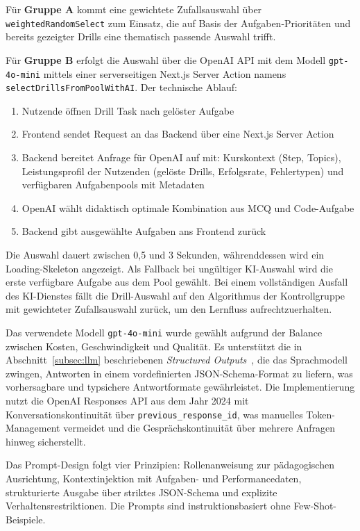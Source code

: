 Für \textbf{Gruppe A} kommt eine gewichtete Zufallsauswahl über \texttt{weightedRandomSelect} zum Einsatz, die auf Basis der Aufgaben-Prioritäten und bereits gezeigter Drills eine thematisch passende Auswahl trifft.

Für \textbf{Gruppe B} erfolgt die Auswahl über die OpenAI API mit dem Modell \texttt{gpt-4o-mini} mittels einer serverseitigen Next.js Server Action namens \texttt{selectDrillsFromPoolWithAI}.
Der technische Ablauf:
\begin{enumerate}
    \item Nutzende öffnen Drill Task nach gelöster Aufgabe
    \item Frontend sendet Request an das Backend über eine Next.js Server Action
    \item Backend bereitet Anfrage für OpenAI auf mit: Kurskontext (Step, Topics), Leistungsprofil der Nutzenden (gelöste Drills, Erfolgsrate, Fehlertypen) und verfügbaren Aufgabenpools mit Metadaten
    \item OpenAI wählt didaktisch optimale Kombination aus MCQ und Code-Aufgabe
    \item Backend gibt ausgewählte Aufgaben ans Frontend zurück
\end{enumerate}
Die Auswahl dauert zwischen 0,5 und 3 Sekunden, währenddessen wird ein Loading-Skeleton angezeigt.
Als Fallback bei ungültiger KI-Auswahl wird die erste verfügbare Aufgabe aus dem Pool gewählt.
Bei einem vollständigen Ausfall des KI-Dienstes fällt die Drill-Auswahl auf den Algorithmus der Kontrollgruppe mit gewichteter Zufallsauswahl zurück, um den Lernfluss aufrechtzuerhalten.

Das verwendete Modell \texttt{gpt-4o-mini} wurde gewählt aufgrund der Balance zwischen Kosten, Geschwindigkeit und Qualität.
Es unterstützt die in Abschnitt~\ref{subsec:llm} beschriebenen \textit{Structured Outputs}~\cite{openai_structured_outputs}, die das Sprachmodell zwingen, Antworten in einem vordefinierten JSON-Schema-Format zu liefern, was vorhersagbare und typsichere Antwortformate gewährleistet.
Die Implementierung nutzt die OpenAI Responses API aus dem Jahr 2024 mit Konversationskontinuität über \texttt{previous\_response\_id}, was manuelles Token-Management vermeidet und die Gesprächskontinuität über mehrere Anfragen hinweg sicherstellt.

Das Prompt-Design folgt vier Prinzipien: Rollenanweisung zur pädagogischen Ausrichtung, Kontextinjektion mit Aufgaben- und Performancedaten, strukturierte Ausgabe über striktes JSON-Schema und explizite Verhaltensrestriktionen. Die Prompts sind instruktionsbasiert ohne Few-Shot-Beispiele.

